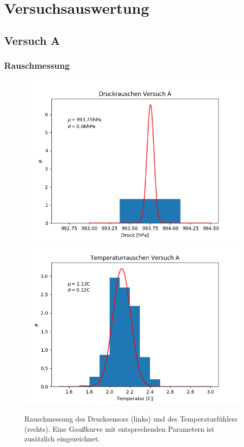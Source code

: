 \documentclass[12pt,a4paper]{article}
\begin{document}
\section{Versuchsauswertung}
\subsection{Versuch A}

\subsubsection{Rauschmessung}
\begin{figure}
\includegraphics[scale=0.5]{Bilder/DruckrauschenA}
\includegraphics[scale=0.5]{Bilder/TemprauschenA}
\caption[Rauschen Versuch A]{Rauschmessung des Drucksensors (links) und des Temperaturfühlers (rechts). Eine Gaußkurve mit entsprechenden Parametern ist zusätzlich eingezeichnet.}
\label{fig:RauschenA}
\end{figure}
\end{document}
